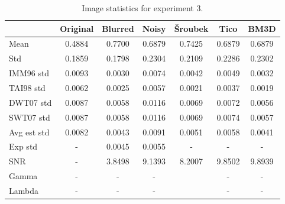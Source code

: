 \documentclass[12pt,notitlepage]{report}
\begin{document}
\begin{table}[htb]
	\centering
	\begin{tabular}{ | l | c | c | c | c | c | c | }
	\hline
		        & Original & Blurred & Noisy  & Šroubek & Tico   & BM3D   \\ \hline 
	Mean        & 0.4884   & 0.7700  & 0.6879 & 0.7425  & 0.6879 & 0.6879 \\ \hline 
	Std         & 0.1859   & 0.1798  & 0.2304 & 0.2109  & 0.2286 & 0.2302 \\ \hline 
	IMM96 std   & 0.0093   & 0.0030  & 0.0074 & 0.0042  & 0.0049 & 0.0032 \\ \hline 
	TAI98 std   & 0.0062   & 0.0025  & 0.0057 & 0.0021  & 0.0037 & 0.0019 \\ \hline 
	DWT07 std   & 0.0087   & 0.0058  & 0.0116 & 0.0069  & 0.0072 & 0.0056 \\ \hline 
	SWT07 std   & 0.0087   & 0.0058  & 0.0116 & 0.0069  & 0.0074 & 0.0057 \\ \hline 
	Avg est std & 0.0082   & 0.0043  & 0.0091 & 0.0051  & 0.0058 & 0.0041 \\ \hline 
	Exp std     & -        & 0.0045  & 0.0055 & -       & -      & -      \\ \hline 
	SNR         & -        & 3.8498  & 9.1393 & 8.2007  & 9.8502 & 9.8939 \\ \hline 
	Gamma       & -        & -       & -      &         & -      & -      \\ \hline 
	Lambda      & -        & -       & -      &         & -      & -      \\ \hline 

	\end{tabular}
	\caption{Image statistics for experiment 3.}
	\label{tab:experiment_003_statistics}
\end{table}

\clearpage
\end{document}
